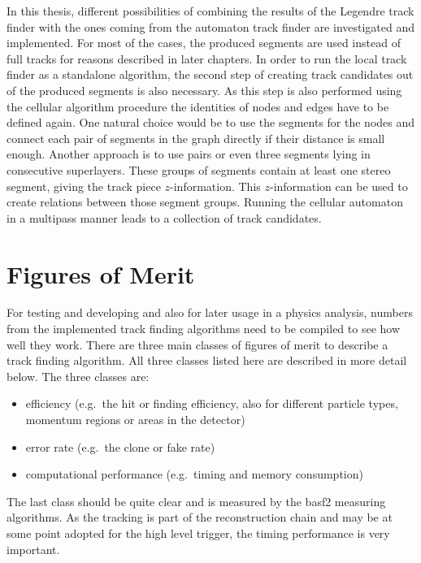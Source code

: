 In this thesis, different possibilities of combining the results of the Legendre track finder with the ones coming from the automaton track finder are investigated and implemented. For most of the cases, the produced segments are used instead of full tracks for reasons described in later chapters. In order to run the local track finder as a standalone algorithm, the second step of creating track candidates out of the produced segments is also necessary. As this step is also performed using the cellular algorithm procedure the identities of nodes and edges have to be defined again. One natural choice would be to use the segments for the nodes and connect each pair of segments in the graph directly if their distance is small enough. Another approach is to use pairs or even three segments lying in consecutive superlayers. These groups of segments contain at least one stereo segment, giving the track piece $z$-information. This $z$-information can be used to create relations between those segment groups. Running the cellular automaton in a multipass manner leads to a collection of track candidates.


\section{Figures of Merit}

For testing and developing and also for later usage in a physics analysis, numbers from the implemented track finding algorithms need to be compiled to see how well they work. There are three main classes of figures of merit to describe a track finding algorithm. All three classes listed here are described in more detail below. The three classes are:
\begin{itemize}
  \item efficiency (e.g.\ the hit or finding efficiency, also for different particle types, momentum regions or areas in the detector)
  \item error rate (e.g.\ the clone or fake rate)
  \item computational performance (e.g.\ timing and memory consumption)
\end{itemize}

The last class should be quite clear and is measured by the basf2 measuring algorithms. As the tracking is part of the reconstruction chain and may be at some point adopted for the high level trigger, the timing performance is very important. 

